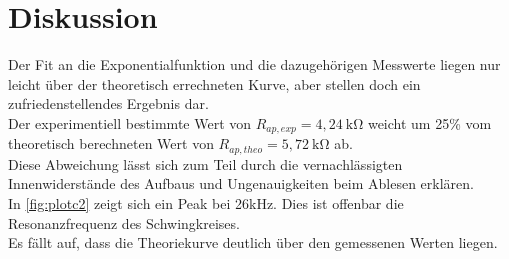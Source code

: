 \section{Diskussion}
\label{sec:Diskussion}



Der Fit an die Exponentialfunktion und die dazugehörigen Messwerte liegen nur leicht über der theoretisch 
errechneten Kurve, aber stellen doch ein zufriedenstellendes Ergebnis dar. \\




Der experimentiell bestimmte Wert von $R_{ap,exp} = 4,24 \: \mathrm{k\Omega}$ weicht um 25\% vom theoretisch berechneten Wert von 
$R_{ap,theo} = 5,72 \: \mathrm{k\Omega}$ ab. \\
Diese Abweichung lässt sich zum Teil durch die vernachlässigten Innenwiderstände des Aufbaus und Ungenauigkeiten 
beim Ablesen erklären.\\




In \autoref{fig:plotc2} zeigt sich ein Peak bei 26kHz. Dies ist offenbar die Resonanzfrequenz
des Schwingkreises. \\
Es fällt auf, dass die Theoriekurve deutlich über den gemessenen Werten liegen.\\ %

 

